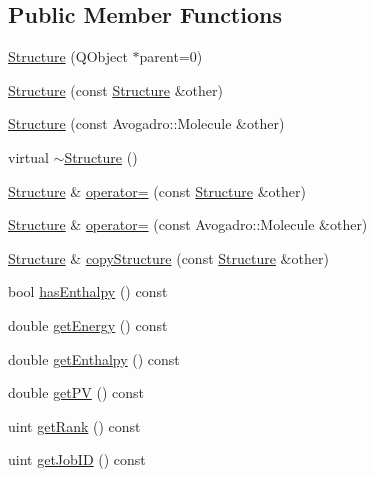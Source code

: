 \subsection*{Public Member Functions}
\begin{DoxyCompactItemize}
\item 
\hyperlink{classGlobalSearch_1_1Structure_ab7e8a0041535442bca879148833831ac}{Structure} (Q\-Object $\ast$parent=0)
\item 
\hyperlink{classGlobalSearch_1_1Structure_ad5f2adb0f379ee6dde14984df3eb73bc}{Structure} (const \hyperlink{classGlobalSearch_1_1Structure}{Structure} \&other)
\item 
\hyperlink{classGlobalSearch_1_1Structure_a2630d5c42da1cd86bd0c3b7d79e69618}{Structure} (const Avogadro\-::\-Molecule \&other)
\item 
virtual \hyperlink{classGlobalSearch_1_1Structure_a29cc3acd03872d7641a2fd76a53e0491}{$\sim$\-Structure} ()
\item 
\hyperlink{classGlobalSearch_1_1Structure}{Structure} \& \hyperlink{classGlobalSearch_1_1Structure_a4b257e8547d62da1c2393c123da994f1}{operator=} (const \hyperlink{classGlobalSearch_1_1Structure}{Structure} \&other)
\item 
\hyperlink{classGlobalSearch_1_1Structure}{Structure} \& \hyperlink{classGlobalSearch_1_1Structure_a22737e6da3810566ad0b8c6b672e1214}{operator=} (const Avogadro\-::\-Molecule \&other)
\item 
\hyperlink{classGlobalSearch_1_1Structure}{Structure} \& \hyperlink{classGlobalSearch_1_1Structure_accb684b9686676fd61164f298460f195}{copy\-Structure} (const \hyperlink{classGlobalSearch_1_1Structure}{Structure} \&other)
\item 
bool \hyperlink{classGlobalSearch_1_1Structure_a6f963ec03dda49caa05f5eb8a9f19c39}{has\-Enthalpy} () const 
\item 
double \hyperlink{classGlobalSearch_1_1Structure_acc6db7487d8bbeacda3868734f4294bd}{get\-Energy} () const 
\item 
double \hyperlink{classGlobalSearch_1_1Structure_a45e5069495574ae2d4b73a1759b7326b}{get\-Enthalpy} () const 
\item 
double \hyperlink{classGlobalSearch_1_1Structure_a66f08d0683f89fa6791b5b7b9838955d}{get\-P\-V} () const 
\item 
uint \hyperlink{classGlobalSearch_1_1Structure_aad467ff9bf423156b7cc8df3a2fb7b13}{get\-Rank} () const 
\item 
uint \hyperlink{classGlobalSearch_1_1Structure_a6d044ecacb068406234a502d30664bea}{get\-Job\-I\-D} () const 

\end{DoxyCompactItemize}
